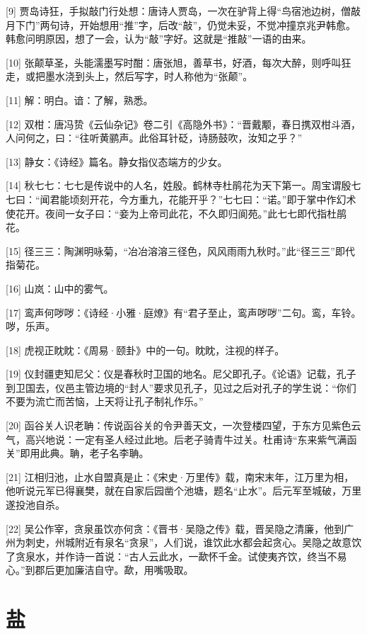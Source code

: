 \documentclass[12pt,UTF8]{ctexbook}
\begin{document}
[9] 贾岛诗狂，手拟敲门行处想：唐诗人贾岛，一次在驴背上得“鸟宿池边树，僧敲月下门”两句诗，开始想用“推”字，后改“敲”，仍觉未妥，不觉冲撞京兆尹韩愈。韩愈问明原因，想了一会，认为“敲”字好。这就是“推敲”一语的由来。

[10] 张颠草圣，头能濡墨写时酣：唐张旭，善草书，好酒，每次大醉，则呼叫狂走，或把墨水浇到头上，然后写字，时人称他为“张颠”。

[11] 解：明白。谙：了解，熟悉。

[12] 双柑：唐冯贽《云仙杂记》卷二引《高隐外书》：“晋戴颙，春日携双柑斗酒，人问何之，曰：“往听黄鹂声。此俗耳针砭，诗肠鼓吹，汝知之乎？”

[13] 静女：《诗经》篇名。静女指仪态端方的少女。

[14] 秋七七：七七是传说中的人名，姓殷。鹤林寺杜鹃花为天下第一。周宝谓殷七七曰：“闻君能顷刻开花，今方重九，花能开乎？”七七曰：“诺。”即于掌中作幻术使花开。夜间一女子曰：“妾为上帝司此花，不久即归阆苑。”此七七即代指杜鹃花。

[15] 径三三：陶渊明咏菊，“冶冶溶溶三径色，风风雨雨九秋时。”此“径三三”即代指菊花。

[16] 山岚：山中的雾气。

[17] 鸾声何哕哕：《诗经·小雅·庭燎》有“君子至止，鸾声哕哕”二句。鸾，车铃。哕，乐声。

[18] 虎视正眈眈：《周易·颐卦》中的一句。眈眈，注视的样子。

[19] 仪封疆吏知尼父：仪是春秋时卫国的地名。尼父即孔子。《论语》记载，孔子到卫国去，仪邑主管边境的“封人”要求见孔子，见过之后对孔子的学生说：“你们不要为流亡而苦恼，上天将让孔子制礼作乐。”

[20] 函谷关人识老聃：传说函谷关的令尹善天文，一次登楼四望，于东方见紫色云气，高兴地说：一定有圣人经过此地。后老子骑青牛过关。杜甫诗“东来紫气满函关”即用此典。聃，老子名李聃。

[21] 江相归池，止水自盟真是止：《宋史·万里传》载，南宋末年，江万里为相，他听说元军已得襄樊，就在自家后园凿个池塘，题名“止水”。后元军至城破，万里遂投池自杀。

[22] 吴公作宰，贪泉虽饮亦何贪：《晋书·吴隐之传》载，晋吴隐之清廉，他到广州为刺史，州城附近有泉名“贪泉”，人们说，谁饮此水都会起贪心。吴隐之故意饮了贪泉水，并作诗一首说：“古人云此水，一歃怀千金。试使夷齐饮，终当不易心。”到郡后更加廉洁自守。歃，用嘴吸取。





\chapter{盐}
\end{document}
